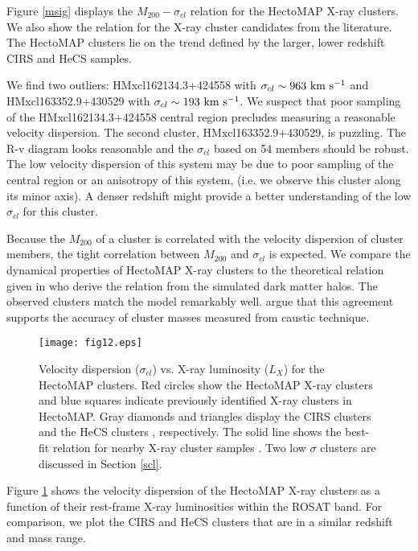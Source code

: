 \documentclass[iop, apj]{emulateapj}
\newcommand{\kms}{\rm km~s^{-1}}
\begin{document}
Figure \ref{msig} displays the $M_{200} - \sigma_{cl}$ relation 
 for the HectoMAP X-ray clusters. 
We also show the relation for the X-ray cluster candidates from the literature.  
The HectoMAP clusters lie on the trend defined by 
 the larger, lower redshift CIRS \citep{Rines06} and HeCS \citep{Rines13, Rines16} samples.
 
We find two outliers: 
 HMxcl162134.3+424558 with $\sigma_{cl} \sim 963~\kms$ and 
 HMxcl163352.9+430529 with $\sigma_{cl} \sim 193~\kms$. 
We suspect that poor sampling of the HMxcl162134.3+424558 central region
 precludes measuring a reasonable velocity dispersion. 
The second cluster, HMxcl163352.9+430529, is puzzling. 
The R-v diagram looks reasonable and the $\sigma_{cl}$ based on 54 members should be robust. 
The low velocity dispersion of this system may be  
 due to poor sampling of the central region or an anisotropy of this system, 
 (i.e. we observe this cluster along its minor axis). 
A denser redshift might provide 
 a better understanding of the low $\sigma_{cl}$ for this cluster. 
 
Because the $M_{200}$ of a cluster is correlated with 
 the velocity dispersion of cluster members,
 the tight correlation between $M_{200}$ and $\sigma_{cl}$ is expected. 
We compare the dynamical properties of HectoMAP X-ray clusters
 to the theoretical relation given in \citet{Evrard08}
 who derive the relation from the simulated dark matter halos. 
The observed clusters match the model remarkably well. 
\citet{Rines13} argue that this agreement supports the accuracy
 of cluster masses measured from caustic technique.

\begin{figure}
\centering
\texttt{[image: fig12.eps]}
\caption{
Velocity dispersion ($\sigma_{cl}$) vs. X-ray luminosity ($L_{X}$) for the HectoMAP clusters. 
Red circles show the HectoMAP X-ray clusters and 
 blue squares indicate previously identified X-ray clusters in HectoMAP. 
Gray diamonds and triangles display 
 the CIRS clusters \citep{Rines06} and the HeCS clusters \citep{Rines13},
 respectively. 
The solid line shows the best-fit relation for nearby X-ray cluster samples \citep{Zhang11}. 
Two low $\sigma$ clusters are discussed in Section \ref{scl}. }
\label{lxsig}
\end{figure}

Figure \ref{lxsig} shows 
 the velocity dispersion of the HectoMAP X-ray clusters 
 as a function of their rest-frame X-ray luminosities within the ROSAT band.
For comparison, 
 we plot the CIRS and HeCS clusters 
 that are in a similar redshift and mass range. 
\end{document}
